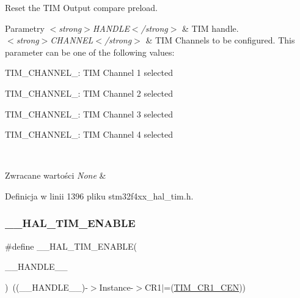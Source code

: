 Reset the T\+IM Output compare preload. 


\begin{DoxyParams}{Parametry}
{\em $<$strong$>$\+H\+A\+N\+D\+L\+E$<$/strong$>$} & T\+IM handle. \\
\hline
{\em $<$strong$>$\+C\+H\+A\+N\+N\+E\+L$<$/strong$>$} & T\+IM Channels to be configured. This parameter can be one of the following values\+: \begin{DoxyItemize}
\item T\+I\+M\+\_\+\+C\+H\+A\+N\+N\+E\+L\+\_\+: T\+IM Channel 1 selected \item T\+I\+M\+\_\+\+C\+H\+A\+N\+N\+E\+L\+\_\+: T\+IM Channel 2 selected \item T\+I\+M\+\_\+\+C\+H\+A\+N\+N\+E\+L\+\_\+: T\+IM Channel 3 selected \item T\+I\+M\+\_\+\+C\+H\+A\+N\+N\+E\+L\+\_\+: T\+IM Channel 4 selected \end{DoxyItemize}
\\
\hline
\end{DoxyParams}

\begin{DoxyRetVals}{Zwracane wartości}
{\em None} & \\
\hline
\end{DoxyRetVals}


Definicja w linii 1396 pliku stm32f4xx\+\_\+hal\+\_\+tim.\+h.

\mbox{\label{group___t_i_m___exported___macros_ga1a90544705059e9f19f991651623b0c0}} 
\subsubsection{\texorpdfstring{\+\_\+\+\_\+\+H\+A\+L\+\_\+\+T\+I\+M\+\_\+\+E\+N\+A\+B\+LE}{\_\_HAL\_TIM\_ENABLE}}
{\footnotesize\ttfamily \#define \+\_\+\+\_\+\+H\+A\+L\+\_\+\+T\+I\+M\+\_\+\+E\+N\+A\+B\+LE(\begin{DoxyParamCaption}\item[{}]{\+\_\+\+\_\+\+H\+A\+N\+D\+L\+E\+\_\+\+\_\+ }\end{DoxyParamCaption})~((\+\_\+\+\_\+\+H\+A\+N\+D\+L\+E\+\_\+\+\_\+)-\/$>$Instance-\/$>$C\+R1$\vert$=(\hyperlink{group___peripheral___registers___bits___definition_ga93d86355e5e3b399ed45e1ca83abed2a}{T\+I\+M\+\_\+\+C\+R1\+\_\+\+C\+EN}))}



